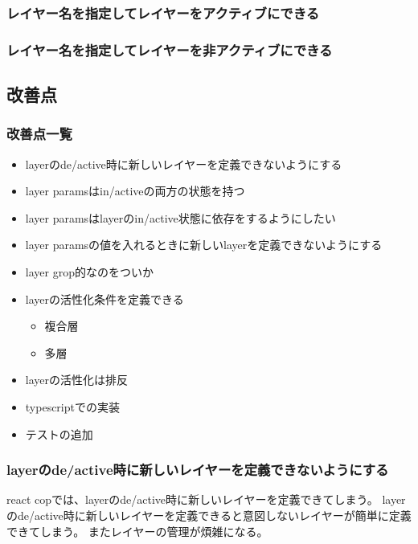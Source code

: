 \documentclass{jsarticle}
\begin{document}
    \subsubsection{レイヤー名を指定してレイヤーをアクティブにできる}
    \subsubsection{レイヤー名を指定してレイヤーを非アクティブにできる}



    \subsection{改善点}

    \subsubsection{改善点一覧}
    \begin{itemize}
    \item layerのde/active時に新しいレイヤーを定義できないようにする
    \item layer paramsはin/activeの両方の状態を持つ
    \item layer paramsはlayerのin/active状態に依存をするようにしたい
    \item layer paramsの値を入れるときに新しいlayerを定義できないようにする
    \item layer grop的なのをついか
    \item layerの活性化条件を定義できる
    \begin{itemize}
    \item 複合層
    \item 多層
    \end{itemize}
    \item layerの活性化は排反
    \item typescriptでの実装
    \item テストの追加
    \end{itemize}

    \subsubsection{layerのde/active時に新しいレイヤーを定義できないようにする}
    react copでは、layerのde/active時に新しいレイヤーを定義できてしまう。
    layerのde/active時に新しいレイヤーを定義できると意図しないレイヤーが簡単に定義できてしまう。
    またレイヤーの管理が煩雑になる。
\end{document}
